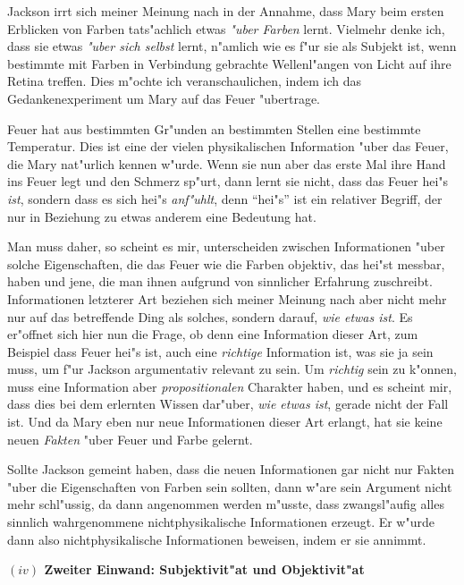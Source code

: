 \documentclass[a4paper, emulatestandardclasses, 12pt]{scrartcl}
\begin{document}
\begin{onehalfspace}
\noindent Jackson irrt sich meiner Meinung nach in der Annahme, dass Mary beim ersten Erblicken von Farben tats"achlich etwas \emph{"uber Farben} lernt. Vielmehr denke ich, dass sie etwas \emph{"uber sich selbst} lernt, n"amlich wie es f"ur sie als Subjekt ist, wenn bestimmte mit Farben in Verbindung gebrachte Wellenl"angen von Licht auf ihre Retina treffen. Dies m"ochte ich veranschaulichen, indem ich das Gedankenexperiment um Mary auf das Feuer "ubertrage. 

Feuer hat aus bestimmten Gr"unden an bestimmten Stellen eine bestimmte Temperatur. Dies ist eine der vielen physikalischen Information "uber das Feuer, die Mary nat"urlich kennen w"urde. Wenn sie nun aber das erste Mal ihre Hand ins Feuer legt und den Schmerz sp"urt, dann lernt sie nicht, dass das Feuer hei"s \emph{ist}, sondern dass es sich hei"s \emph{anf"uhlt}, denn "`hei"s"' ist ein relativer Begriff, der nur in Beziehung zu etwas anderem eine Bedeutung hat.

Man muss daher, so scheint es mir, unterscheiden zwischen Informationen "uber solche Eigenschaften, die das Feuer wie die Farben objektiv, das hei"st messbar, haben und jene, die man ihnen aufgrund von sinnlicher Erfahrung zuschreibt. Informationen letzterer Art beziehen sich meiner Meinung nach aber nicht mehr nur auf das betreffende Ding als solches, sondern darauf, \emph{wie etwas ist}. Es er"offnet sich hier nun die Frage, ob denn eine Information dieser Art, zum Beispiel dass Feuer hei"s ist, auch eine \emph{richtige} Information ist, was sie ja sein muss, um f"ur Jackson argumentativ relevant zu sein. Um \emph{richtig} sein zu k"onnen, muss eine Information aber \emph{propositionalen} Charakter haben, und es scheint mir, dass dies bei dem erlernten Wissen dar"uber, \emph{wie etwas ist}, gerade nicht der Fall ist. Und da Mary eben nur neue Informationen dieser Art erlangt, hat sie keine neuen \emph{Fakten} "uber Feuer und Farbe gelernt. 

Sollte Jackson gemeint haben, dass die neuen Informationen gar nicht nur Fakten "uber die Eigenschaften von Farben sein sollten, dann w"are sein Argument nicht mehr schl"ussig, da dann angenommen werden m"usste, dass zwangsl"aufig alles sinnlich wahrgenommene nichtphysikalische Informationen erzeugt. Er w"urde dann also nichtphysikalische Informationen beweisen, indem er sie annimmt.

\vspace{5mm}
\noindent\textbf{$(iv)$ Zweiter Einwand: Subjektivit"at und Objektivit"at}


\end{onehalfspace}
\end{document}
